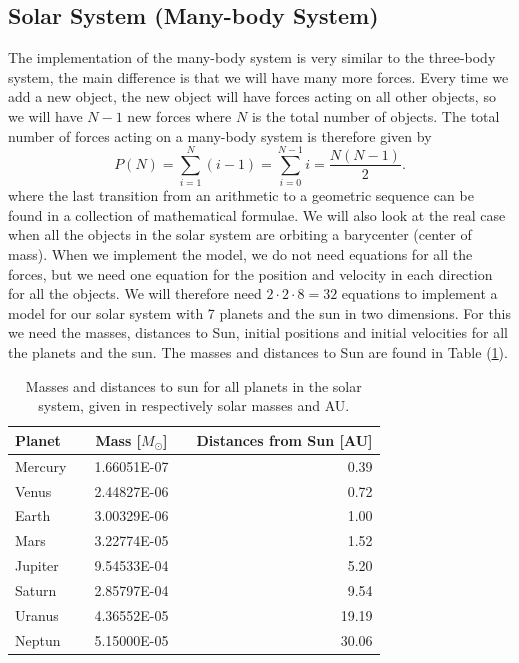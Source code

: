 \documentclass[norsk,a4paper,12pt]{article}
\begin{document}
\subsection{Solar System (Many-body System)}
The implementation of the many-body system is very similar to the three-body system, the main difference is that we will have many more forces. Every time we add a new object, the new object will have forces acting on all other objects, so we will have $N-1$ new forces where $N$ is the total number of objects. The total number of forces acting on a many-body system is therefore given by
\begin{equation}
P(N)=\sum_{i=1}^N(i-1)=\sum_{i=0}^{N-1}i=\frac{N(N-1)}{2}.
\end{equation}
where the last transition from an arithmetic to a geometric sequence can be found in a collection of mathematical formulae.  We will also look at the real case when all the objects in the solar system are orbiting a barycenter (center of mass). When we implement the model, we do not need equations for all the forces, but we need one equation for the position and velocity in each direction for all the objects. We will therefore need $2\cdot2\cdot8=32$ equations to implement a model for our solar system with 7 planets and the sun in two dimensions. For this we need the masses, distances to Sun, initial positions and initial velocities for all the planets and the sun. The masses and distances to Sun are found in Table (\ref{tab:Masses}).
\begin{table}[H]
\centering
\caption{Masses and distances to sun for all planets in the solar system, given in respectively solar masses and AU.}
\label{tab:Masses}
\begin{tabular}{lcccr}
\hline
Planet  &   & Mass [$M_\odot$] &    & Distances from Sun [AU] \\
\hline
Mercury 	&	& 1.66051E-07  &    & 0.39    \\
Venus   &   & 2.44827E-06  &    & 0.72    \\
Earth   &   & 3.00329E-06  &    & 1.00    \\
Mars    &   & 3.22774E-05  &    & 1.52    \\
Jupiter &   & 9.54533E-04  &    & 5.20    \\
Saturn 	&	& 2.85797E-04  &    & 9.54    \\
Uranus 	&	& 4.36552E-05  &    & 19.19   \\
Neptun  &	& 5.15000E-05  &    & 30.06   \\
\hline
\end{tabular}
\end{table}
\end{document}
